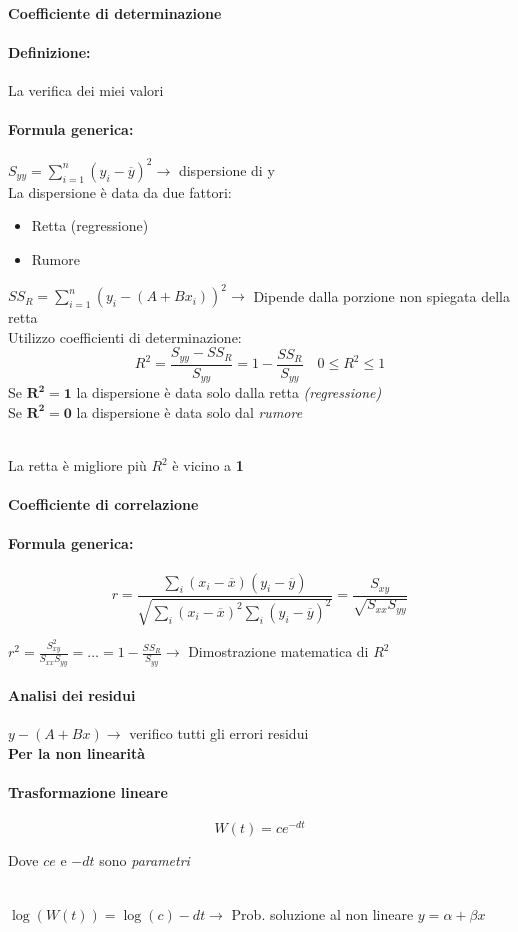 \documentclass[]{article}
\newcommand{\definizione}{\paragraph{Definizione:}}
\newcommand{\formula}{\paragraph{Formula generica:}}
\begin{document}
    \paragraph{Coefficiente di determinazione}
    \definizione La verifica dei miei valori
    \formula $S_{yy} = \sum_{i = 1}^{n}(y_i - \overline{y})^2 \rightarrow$ dispersione di y \\
    La dispersione è data da due fattori:
    \begin{itemize}
        \item Retta (regressione)
        \item Rumore
    \end{itemize}
    $\displaystyle SS_R = \sum_{i = 1}^{n}(y_i - (A + B x_i))^2 \rightarrow$ Dipende dalla porzione non spiegata della retta \\
    Utilizzo coefficienti di determinazione:
    \[ R^2 = \frac{S_{yy} - SS_R}{S_{yy}} = 1 - \frac{SS_R}{S_{yy}} \quad 0 \leq R^2 \leq 1 \] 
    Se $\mathbf{R^2 = 1}$ la dispersione è data solo dalla retta \textit{(regressione)} \\
    Se $\mathbf{R^2 = 0}$ la dispersione è data solo dal \textit{rumore} \\\\
    \centerline{La retta è migliore più $R^2$ è vicino a \textbf{1}}
    \paragraph{Coefficiente di correlazione}
    \formula
    \[ r = \frac{\sum_{i}^{} (x_i - \overline{x}) (y_i - \overline{y})}{\sqrt{\sum_{i}^{}(x_i - \overline{x})^2 \sum_{i}^{} (y_i - \overline{y})^2}}= \frac{S_{xy}}{\sqrt{S_{xx} S_{yy}}} \]
    \centerline{$r^2 = \frac{S_{xy}^2}{S_{xx} S_{yy}} = \ldots = 1 - \frac{SS_R}{S_{yy}} \rightarrow $ Dimostrazione matematica di $R^2$}
    \paragraph{Analisi dei residui} $y-(A + Bx) \rightarrow$ verifico tutti gli errori residui \\
    \textbf{Per la non linearità}
    \paragraph{Trasformazione lineare}
    \[ W(t) = ce^{-dt} \]
    \centerline{Dove $ce$ e $-dt$ sono \textit{parametri}} \\[3ex]
    $\log(W(t)) = \log(c) -dt \rightarrow$ Prob. soluzione al non lineare $y = \alpha + \beta x$
\end{document}
